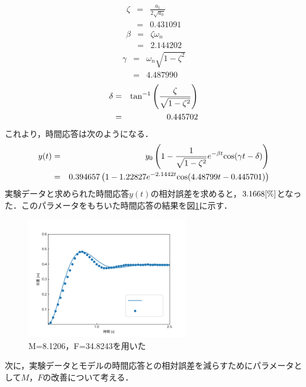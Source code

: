 \documentclass[12pt]{jsarticle}
\begin{document}
\begin{eqnarray}
  \label{StepResponse_calculate_zeta}
  \zeta &=& \frac{a_1}{2\sqrt{a_0}} \\
        &=& 0.431091 \nonumber
\end{eqnarray}
\begin{eqnarray}
  \label{StepResponse_calculate_beta}
  \beta &=& \zeta \omega_n \\
        &=& 2.144202 \nonumber
\end{eqnarray}
\begin{eqnarray}
  \label{StepResponse_calculate_gamma}
  \gamma &=& \omega_n\sqrt{1-\zeta^2} \\
         &=& 4.487990 \nonumber
\end{eqnarray}
\begin{eqnarray}
  \label{StepResponse_calculate_delta}
  \delta &=& {\rm tan}^{-1}\left(\frac{\zeta}{\sqrt{1-\zeta^2}}\right) \\
         &=& 0.445702 \nonumber
\end{eqnarray}
これより，時間応答は次のようになる．
\begin{eqnarray}
  \label{Response_y_t}
  y(t) &=& y_0\left(1 - \frac{1}{\sqrt{1-\zeta^2}}e^{-\beta t}{\rm cos}(\gamma t - \delta)\right) \\
       &=& 0.394657\left(1 - 1.22827e^{-2.1442 t}{\rm cos}(4.48799 t - 0.445701)\right) \nonumber
\end{eqnarray}
実験データと求められた時間応答$y(t)$の相対誤差を求めると，$3.1668{\rm [\%]}$となった．このパラメータをもちいた時間応答の結果を図\ref{Initial_MF_doutei}に示す．
\begin{figure}[tb]
  \begin{center}
    \includegraphics[clip,width=7.0cm]{../img/Initial_MF_doutei.png}
    \caption{M=8.1206，F=34.8243を用いた}
    \label{Initial_MF_doutei}
  \end{center}
\end{figure}
次に，実験データとモデルの時間応答との相対誤差を減らすためにパラメータとして$M$，$F$の改善について考える．
\end{document}
